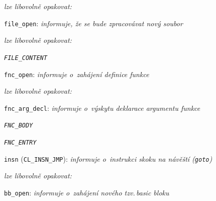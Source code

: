 \newpage
\begin{myitemize}[itemsep=0pt,partopsep=0pt,parsep=0pt,topsep=0pt,label=\textbullet]
  \item[\ndash] \textsl{lze libovolně opakovat:}
    \begin{myitemize}[itemsep=0pt,partopsep=0pt,parsep=0pt,topsep=0pt,label=\textbullet]
      \item \texttt{file\_open}: \textit{informuje, že se bude zpracovávat nový soubor}
      \item[\ndash] \textsl{lze libovolně opakovat:}
        \begin{myitemize}
          \item[\whitebullet] \texttt{\textit{FILE\_CONTENT}}
            \begin{myitemize}[itemsep=0pt,partopsep=0pt,parsep=0pt,topsep=0pt,label=\textbullet]
              \item \texttt{fnc\_open}: \textit{informuje o~zahájení definice funkce}
              \item[\ndash] \textsl{lze libovolně opakovat:}
                \begin{myitemize}[itemsep=0pt,partopsep=0pt,parsep=0pt,topsep=0pt,label=\textbullet]
                  \item \texttt{fnc\_arg\_decl}: \textit{informuje o~výskytu deklarace argumentu funkce}
                \end{myitemize}
              \item[\whitebullet] \texttt{\textit{FNC\_BODY}}
                \begin{myitemize}[itemsep=0pt,partopsep=0pt,parsep=0pt,topsep=0pt,label=\textbullet]
                  \item[\whitebullet] \texttt{\textit{FNC\_ENTRY}}
                    \begin{myitemize}[itemsep=0pt,partopsep=0pt,parsep=0pt,topsep=0pt,label=\textbullet]
                        \item \texttt{insn} (\texttt{CL\_INSN\_JMP}): \textit{informuje o~instrukci skoku na návěští (\texttt{goto})}
                    \end{myitemize}
                  \item[\ndash] \textsl{lze libovolně opakovat:}
                    \begin{myitemize}[itemsep=0pt,partopsep=0pt,parsep=0pt,topsep=0pt,label=\textbullet]
                      \item \texttt{bb\_open}: \textit{informuje o~zahájení nového tzv.\,\emph{basic bloku}%
}
\end{myitemize}
\end{myitemize}
\end{myitemize}
\end{myitemize}
\end{myitemize}
\end{myitemize}

